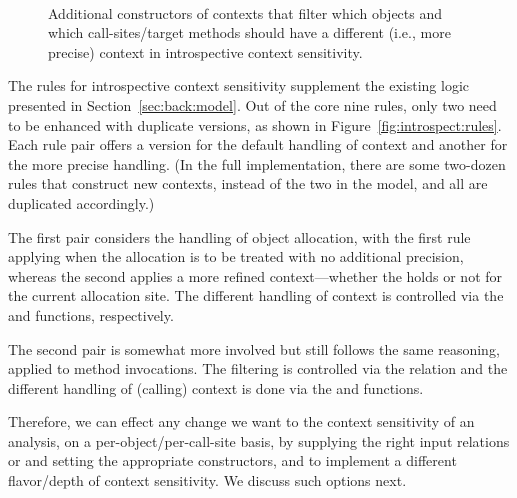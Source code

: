 \begin{figure}[htp]
\begin{datalog}
 \\
\end{datalog}
\caption[]{Additional constructors of contexts that filter which objects and which call-sites/target methods should have a different (i.e., more precise) context in introspective context sensitivity.}
\label{fig:introspect:output}
\end{figure}

The rules for introspective context sensitivity supplement the existing logic presented in Section~\ref{sec:back:model}. Out of the core nine rules, only two need to be enhanced with duplicate versions, as shown in Figure~\ref{fig:introspect:rules}. Each rule pair offers a version for the default handling of context and another for the more precise handling. (In the full implementation, there are some two-dozen rules that construct new contexts, instead of the two in the model, and all are duplicated accordingly.)

The first pair considers the handling of object allocation, with the first rule applying when the allocation is to be treated with no additional precision, whereas the second applies a more refined context---whether the  holds or not for the current allocation site. The different handling of context is controlled via the  and  functions, respectively.

The second pair is somewhat more involved but still follows the same reasoning, applied to method invocations. The filtering is controlled via the  relation and the different handling of (calling) context is done via the  and  functions.

Therefore, we can effect any change we want to the context sensitivity of an analysis, on a per-object/per-call-site basis, by supplying the right input relations  or  and setting the appropriate constructors,  and  to implement a different flavor/depth of context sensitivity. We discuss such options next.

